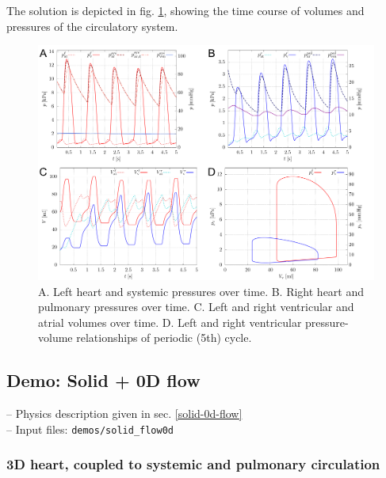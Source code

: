 \documentclass[a4paper,12pt]{report}
\begin{document}
The solution is depicted in fig. \ref{fig:syspul_results}, showing the time course of volumes and pressures of the circulatory system.

\begin{figure}
\centering
\includegraphics[width=1.0\textwidth]{fig/syspul_results.png}
\caption{A. Left heart and systemic pressures over time. B. Right heart and pulmonary pressures over time. C. Left and right ventricular and atrial volumes over time. D. Left and right ventricular pressure-volume relationships of periodic (5th) cycle.}
\label{fig:syspul_results}
\end{figure}


\subsection{Demo: Solid + 0D flow}\label{demo-solid-0d-flow}

-- Physics description given in sec. \ref{solid-0d-flow}\\

-- Input files: \verb"demos/solid_flow0d"

\subsubsection*{3D heart, coupled to systemic and pulmonary circulation}
\end{document}

